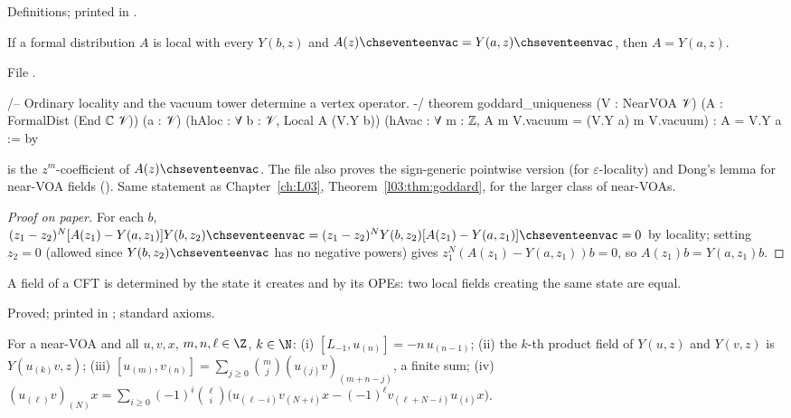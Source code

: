 \begin{status}
Definitions; printed in .
\end{status}

\begin{theorem}\label{ch17:thm:goddard}
If a formal distribution $A$ is local with every $Y(b,z)$ and $A(z)\chseventeenvac=Y(a,z)\chseventeenvac$, then $A=Y(a,z)$.
\end{theorem}

\noindent File .
\begin{leancode}
/-- Ordinary locality and the vacuum tower determine a vertex operator. -/
theorem goddard_uniqueness (V : NearVOA 𝒱) (A : FormalDist (End ℂ 𝒱)) (a : 𝒱)
    (hAloc : ∀ b : 𝒱, Local A (V.Y b))
    (hAvac : ∀ m : ℤ, A m V.vacuum = (V.Y a) m V.vacuum) : A = V.Y a := by
\end{leancode}

\begin{dictionary}
 is the $z^m$-coefficient of $A(z)\chseventeenvac$.  The file also proves the sign-generic pointwise version
 (for $\varepsilon$-locality) and Dong's lemma for near-VOA fields ().
Same statement as Chapter~\ref{ch:L03}, Theorem~\ref{l03:thm:goddard}, for the larger class of near-VOAs.
\end{dictionary}

\begin{proof}[Proof on paper]
For each $b$, $(z_1-z_2)^N[A(z_1)-Y(a,z_1)]Y(b,z_2)\chseventeenvac=(z_1-z_2)^NY(b,z_2)[A(z_1)-Y(a,z_1)]\chseventeenvac=0$ by locality; setting
$z_2=0$ (allowed since $Y(b,z_2)\chseventeenvac$ has no negative powers) gives $z_1^N(A(z_1)-Y(a,z_1))b=0$, so
$A(z_1)b=Y(a,z_1)b$.
\end{proof}

\begin{physics}
A field of a CFT is determined by the state it creates and by its OPEs: two local fields creating the same state are
equal.
\end{physics}

\begin{status}
Proved; printed in ; standard axioms.
\end{status}

\begin{theorem}\label{ch17:thm:nearbasic}
For a near-VOA and all $u,v,x$, $m,n,\ell\in\Z$, $k\in\N$:
(i) $[L_{-1},u_{(n)}]=-n\,u_{(n-1)}$;
(ii) the $k$-th product field of $Y(u,z)$ and $Y(v,z)$ is $Y(u_{(k)}v,z)$;
(iii) $[u_{(m)},v_{(n)}]=\sum_{j\ge0}\binom mj(u_{(j)}v)_{(m+n-j)}$, a finite sum;
(iv) $(u_{(\ell)}v)_{(N)}x=\sum_{i\ge0}(-1)^i\binom\ell i\bigl(u_{(\ell-i)}v_{(N+i)}x-(-1)^\ell v_{(\ell+N-i)}u_{(i)}x\bigr)$.
\end{theorem}

